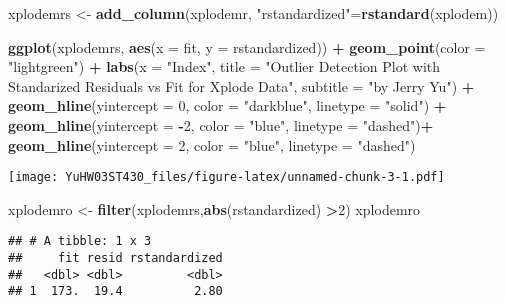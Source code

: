 \documentclass[
]{article}
\newenvironment{Shaded}{\begin{snugshade}}{\end{snugshade}}
\newcommand{\AttributeTok}[1]{\textcolor[rgb]{0.13,0.29,0.53}{#1}}
\newcommand{\DecValTok}[1]{\textcolor[rgb]{0.00,0.00,0.81}{#1}}
\newcommand{\FunctionTok}[1]{\textcolor[rgb]{0.13,0.29,0.53}{\textbf{#1}}}
\newcommand{\NormalTok}[1]{#1}
\newcommand{\OtherTok}[1]{\textcolor[rgb]{0.56,0.35,0.01}{#1}}
\newcommand{\SpecialCharTok}[1]{\textcolor[rgb]{0.81,0.36,0.00}{\textbf{#1}}}
\newcommand{\StringTok}[1]{\textcolor[rgb]{0.31,0.60,0.02}{#1}}
\begin{document}
\begin{Shaded}
\begin{Highlighting}[]
\NormalTok{xplodemrs }\OtherTok{\textless{}{-}} \FunctionTok{add\_column}\NormalTok{(xplodemr, }\StringTok{"rstandardized"}\OtherTok{=}\FunctionTok{rstandard}\NormalTok{(xplodem))}

\FunctionTok{ggplot}\NormalTok{(xplodemrs, }\FunctionTok{aes}\NormalTok{(}\AttributeTok{x =}\NormalTok{ fit, }\AttributeTok{y =}\NormalTok{ rstandardized)) }\SpecialCharTok{+}
  \FunctionTok{geom\_point}\NormalTok{(}\AttributeTok{color =} \StringTok{"lightgreen"}\NormalTok{) }\SpecialCharTok{+}
  \FunctionTok{labs}\NormalTok{(}\AttributeTok{x =} \StringTok{"Index"}\NormalTok{,}
       \AttributeTok{title =} \StringTok{"Outlier Detection Plot with Standarized Residuals vs Fit for Xplode Data"}\NormalTok{,}
       \AttributeTok{subtitle =} \StringTok{"by Jerry Yu"}\NormalTok{) }\SpecialCharTok{+}
  \FunctionTok{geom\_hline}\NormalTok{(}\AttributeTok{yintercept =} \DecValTok{0}\NormalTok{,}
             \AttributeTok{color =} \StringTok{"darkblue"}\NormalTok{,}
             \AttributeTok{linetype =} \StringTok{"solid"}\NormalTok{) }\SpecialCharTok{+}
    \FunctionTok{geom\_hline}\NormalTok{(}\AttributeTok{yintercept =} \SpecialCharTok{{-}}\DecValTok{2}\NormalTok{,}
             \AttributeTok{color =} \StringTok{"blue"}\NormalTok{,}
             \AttributeTok{linetype =} \StringTok{"dashed"}\NormalTok{)}\SpecialCharTok{+}
  \FunctionTok{geom\_hline}\NormalTok{(}\AttributeTok{yintercept =} \DecValTok{2}\NormalTok{,}
             \AttributeTok{color =} \StringTok{"blue"}\NormalTok{,}
             \AttributeTok{linetype =} \StringTok{"dashed"}\NormalTok{)}
\end{Highlighting}
\end{Shaded}

\texttt{[image: YuHW03ST430\_files/figure-latex/unnamed-chunk-3-1.pdf]}

\begin{Shaded}
\begin{Highlighting}[]
\NormalTok{xplodemro }\OtherTok{\textless{}{-}} \FunctionTok{filter}\NormalTok{(xplodemrs,}\FunctionTok{abs}\NormalTok{(rstandardized) }\SpecialCharTok{\textgreater{}}\DecValTok{2}\NormalTok{)}
\NormalTok{xplodemro}
\end{Highlighting}
\end{Shaded}

\begin{verbatim}
## # A tibble: 1 x 3
##     fit resid rstandardized
##   <dbl> <dbl>         <dbl>
## 1  173.  19.4          2.80
\end{verbatim}
\end{document}
